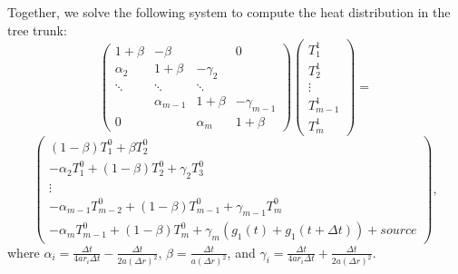 \documentclass{IEEEtran} %
\begin{document}
Together, we solve the following system to compute the heat distribution in the tree trunk: %
\begin{equation*}
    \left( \begin{array}{cccc}
1+\beta & -\beta & & 0\\
\alpha_2 & 1+\beta & -\gamma_2 & \\
\ddots& \ddots & \ddots  & \\
& \alpha_{m-1} & 1+\beta & -\gamma_{m-1} \\
0 & & \alpha_m & 1+\beta \end{array} \right)\left(\begin{array}{c}
     T^1_1  \\
     T^1_2 \\
     \vdots\\
     T^1_{m-1}\\
     T^1_m
\end{array}\right)=\end{equation*}
\begin{equation}
  \left(\begin{array}{c}
     (1-\beta)T^0_1+\beta T^0_2  \\
  -\alpha_2T^0_1+(1-\beta) T^0_2+\gamma_2T^0_3 \\
     \vdots\\
    -\alpha_{m-1}T^0_{m-2} +(1-\beta)T^0_{m-1}+\gamma_{m-1}T^0_m\\
    -\alpha_{m}T^0_{m-1} +(1-\beta) T^0_m +\gamma_m(g_1(t)+g_1(t+\Delta t))+source
\end{array}\right), 
\end{equation}
where $\alpha_i = \frac{\Delta t}{4ar_i\Delta t}-\frac{\Delta t}{2a(\Delta r)^2}$, $\beta = \frac{\Delta t}{a(\Delta r)^2}$, and $\gamma_i = \frac{\Delta t}{4ar_i\Delta t}+\frac{\Delta t}{2a(\Delta r)^2}$. %
\end{document}
